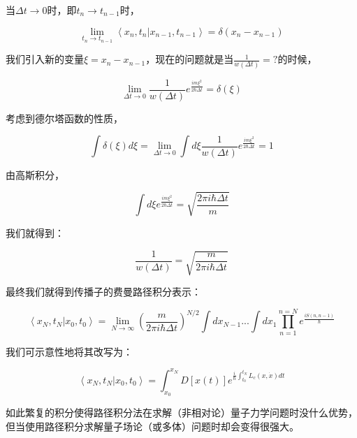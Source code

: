当$\Delta t \to 0$时，即$t_n \to t_{n-1}$时，

\begin{equation}
\lim\limits_{t_n \to t_{n-1}} \left\langle x_n, t_n | x_{n-1}, t_{n-1} \right\rangle = \delta(x_n - x_{n-1}) 
\end{equation}

我们引入新的变量$\xi = x_n - x_{n-1}$，现在的问题就是当$\frac{1}{w(\Delta t)} =?$的时候，

\begin{equation}
\lim\limits_{\Delta t \to 0}  \frac{1}{w (\Delta t)} e^{\frac{i m \xi^2}{2 \hbar \Delta t}} = \delta (\xi) 
\end{equation}

考虑到德尔塔函数的性质，

\begin{equation}
\int \delta(\xi) d \xi =  \lim\limits_{\Delta t \to 0} \int d \xi  \frac{1}{w (\Delta t)} e^{\frac{i m \xi^2}{2 \hbar \Delta t}}   = 1 
\end{equation}

由高斯积分，

\begin{equation}
\int d \xi e^{\frac{i m \xi^2 }{ 2 \hbar \Delta t}  } = \sqrt{ \frac{ 2 \pi i \hbar \Delta t }{m } }
\end{equation}

我们就得到：

\begin{equation}
\frac{1}{w(\Delta t )} = \sqrt{\frac{m }{2 \pi i \hbar \Delta t} }
\end{equation}

最终我们就得到传播子的费曼路径积分表示：

\begin{equation}
\left\langle x_N,t_N | x_0, t_0 \right\rangle = \lim\limits_{N \to \infty} \left( \frac{m }{2 \pi i \hbar \Delta t } \right)^{N/2} \int dx_{N-1} ... \int dx_1 \prod\limits_{n=1}^{n = N} e^{\frac{iS(n, n-1)}{\hbar}} 
\end{equation}

我们可示意性地将其改写为：

\begin{equation}
\left\langle x_N,t_N | x_0, t_0 \right\rangle = \int_{x_0}^{x_N} D[x(t)] e^{ \frac{ i }{ \hbar} \int_{t_0}^{t_N} L_c(x, \dot x) dt }
\end{equation}

如此繁复的积分使得路径积分法在求解（非相对论）量子力学问题时没什么优势，但当使用路径积分求解量子场论（或多体）问题时却会变得很强大。

